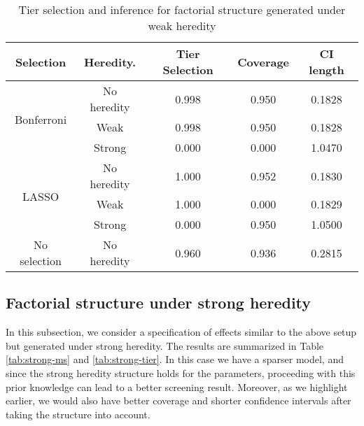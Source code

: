 \documentclass[12pt]{article}
\begin{document}
\begin{table}[ht]
\centering
\caption{Tier selection and inference for factorial structure generated under weak heredity}
\label{tab:weak-tier}
\begin{tabular}{ccccc}
\toprule
        Selection           &   Heredity. & Tier Selection & Coverage & CI length \\ \hline
\multirow{3}{*}{Bonferroni} & No heredity & 0.998          & 0.950    & 0.1828    \\ \cline{2-5} 
                            & Weak        & 0.998          & 0.950    & 0.1828    \\ \cline{2-5} 
                            & Strong      & 0.000          & 0.000    & 1.0470    \\ \hline
\multirow{3}{*}{LASSO}      & No heredity & 1.000          & 0.952    & 0.1830    \\ \cline{2-5} 
                            & Weak        & 1.000          & 0.000    & 0.1829    \\ \cline{2-5} 
                            & Strong      & 0.000          & 0.950    & 1.0500    \\ \hline
No selection                & No heredity & 0.960          & 0.936    & 0.2815    \\ \bottomrule
\end{tabular}
\end{table}





\subsection{Factorial structure under strong heredity}
In this subsection, we consider a specification of effects similar to the above setup but generated under strong heredity. The results are summarized in Table \ref{tab:strong-ms} and \ref{tab:strong-tier}. In this case we have a sparser model, and since the strong heredity structure holds for the parameters, proceeding with this prior knowledge can lead to a better  screening result. Moreover, as we highlight earlier, we would also have better coverage and shorter confidence intervals after taking the structure into account. 
\end{document}
